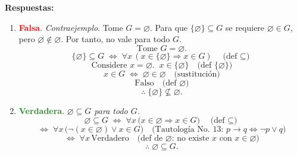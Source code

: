 \documentclass[12pt,letterpaper]{exam}
\begin{document}
\begin{enumerate}
\textbf{Respuestas:}
\begin{enumerate}[label=\alph*)]
\item \textbf{\textcolor{red}{Falsa}}. \textit{Contraejemplo}.
Tome \(G=\varnothing\). Para que \(\{\varnothing\}\subseteq G\) se requiere \(\varnothing\in G\),
pero \(\varnothing\notin\varnothing\). Por tanto, no vale para todo \(G\).
\[
\text{Tome } G=\varnothing.
\]
\[
\{\varnothing\}\subseteq G
\;\iff\; \forall x\,(x\in\{\varnothing\}\Rightarrow x\in G)
\quad\text{(def $\subseteq$)}
\]
\[
\text{Considere } x=\varnothing.\;\; x\in\{\varnothing\} \quad\text{(def $\{\varnothing\}$)}
\]
\[
x\in G \;\iff\; \varnothing\in\varnothing \quad\text{(sustituci\'on)}
\]
\[
\text{Falso} \quad\text{(def $\varnothing$)}
\]
\[
\therefore\; \{\varnothing\}\not\subseteq \varnothing.
\]
\item \textbf{\textcolor{ForestGreen}{Verdadera}}. \textit{$\varnothing \subseteq G$ para todo $G$.}
\[
\varnothing\subseteq G
\;\iff\; \forall x\,\big(x\in\varnothing \Rightarrow x\in G\big)
\quad\text{(def $\subseteq$)}
\]
\[
\iff\; \forall x\,\big(\lnot(x\in\varnothing)\lor x\in G\big)
\quad\text{(Tautología No.\ 13: \(p\to q \iff \lnot p\lor q\))}
\]
\[
\iff\; \forall x\,\text{Verdadero}
\quad\text{(def de $\varnothing$: no existe $x$ con $x\in\varnothing$)}
\]
\[
\therefore\; \varnothing\subseteq G.
\]



\end{enumerate}
\end{enumerate}
\end{document}
